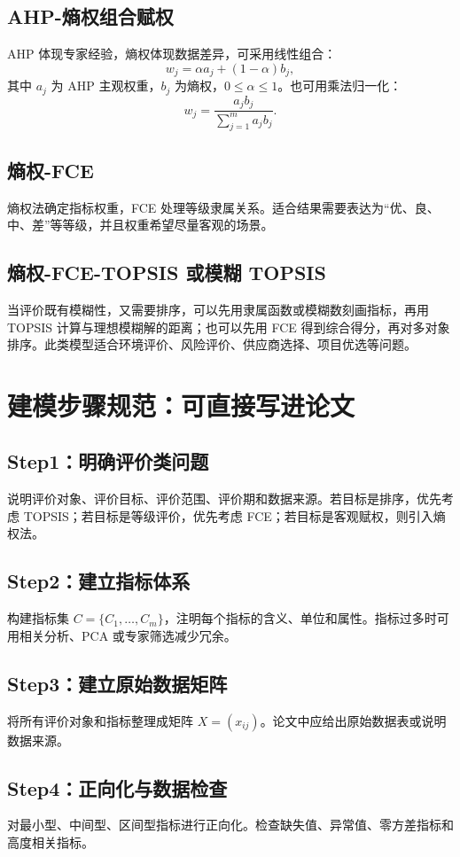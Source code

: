 \documentclass[UTF8,zihao=-4]{ctexart}
\begin{document}
\subsection{AHP-熵权组合赋权}
AHP 体现专家经验，熵权体现数据差异，可采用线性组合：
\[
w_j=\alpha a_j+(1-\alpha)b_j,
\]
其中 $a_j$ 为 AHP 主观权重，$b_j$ 为熵权，$0\le \alpha\le 1$。也可用乘法归一化：
\[
w_j=\frac{a_jb_j}{\sum_{j=1}^m a_jb_j}.
\]

\subsection{熵权-FCE}
熵权法确定指标权重，FCE 处理等级隶属关系。适合结果需要表达为“优、良、中、差”等等级，并且权重希望尽量客观的场景。

\subsection{熵权-FCE-TOPSIS 或模糊 TOPSIS}
当评价既有模糊性，又需要排序，可以先用隶属函数或模糊数刻画指标，再用 TOPSIS 计算与理想模糊解的距离；也可以先用 FCE 得到综合得分，再对多对象排序。此类模型适合环境评价、风险评价、供应商选择、项目优选等问题。

\section{建模步骤规范：可直接写进论文}
\subsection{Step1：明确评价类问题}
说明评价对象、评价目标、评价范围、评价期和数据来源。若目标是排序，优先考虑 TOPSIS；若目标是等级评价，优先考虑 FCE；若目标是客观赋权，则引入熵权法。

\subsection{Step2：建立指标体系}
构建指标集 $C=\{C_1,\ldots,C_m\}$，注明每个指标的含义、单位和属性。指标过多时可用相关分析、PCA 或专家筛选减少冗余。

\subsection{Step3：建立原始数据矩阵}
将所有评价对象和指标整理成矩阵 $X=(x_{ij})$。论文中应给出原始数据表或说明数据来源。

\subsection{Step4：正向化与数据检查}
对最小型、中间型、区间型指标进行正向化。检查缺失值、异常值、零方差指标和高度相关指标。
\end{document}
